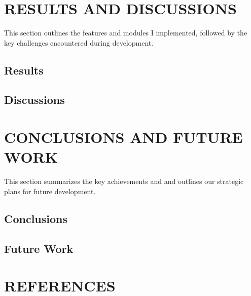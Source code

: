 \documentclass[12pt,a4paper]{article}
\begin{document}
\newpage
\section{RESULTS AND DISCUSSIONS}\label{sec:results_and_discussion}
  \indent

  This section outlines the features and modules I implemented, followed by the key challenges encountered during development.
  \subsection{Results}
  


  \subsection{Discussions}
  

\newpage
\section{ CONCLUSIONS AND FUTURE WORK}\label{sec:conclusion_and_future_scope}
\indent

  This section summarizes the key achievements and and outlines our strategic plans for future development.
  \subsection{Conclusions}
  

  \subsection{Future Work}
  

\newpage
{}
{}
\section*{REFERENCES}


% 
\end{document}
